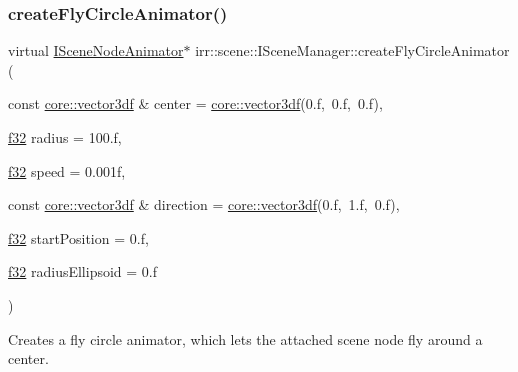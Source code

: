 \subsubsection{\texorpdfstring{create\+Fly\+Circle\+Animator()}{createFlyCircleAnimator()}}
{\footnotesize\ttfamily virtual \hyperlink{classirr_1_1scene_1_1ISceneNodeAnimator}{I\+Scene\+Node\+Animator}$\ast$ irr\+::scene\+::\+I\+Scene\+Manager\+::create\+Fly\+Circle\+Animator (\begin{DoxyParamCaption}\item[{const \hyperlink{namespaceirr_1_1core_a06f169d08b5c429f5575acb7edbad811}{core\+::vector3df} \&}]{center = {\ttfamily \hyperlink{namespaceirr_1_1core_a06f169d08b5c429f5575acb7edbad811}{core\+::vector3df}(0.f,~0.f,~0.f)},  }\item[{\hyperlink{namespaceirr_a0277be98d67dc26ff93b1a6a1d086b07}{f32}}]{radius = {\ttfamily 100.f},  }\item[{\hyperlink{namespaceirr_a0277be98d67dc26ff93b1a6a1d086b07}{f32}}]{speed = {\ttfamily 0.001f},  }\item[{const \hyperlink{namespaceirr_1_1core_a06f169d08b5c429f5575acb7edbad811}{core\+::vector3df} \&}]{direction = {\ttfamily \hyperlink{namespaceirr_1_1core_a06f169d08b5c429f5575acb7edbad811}{core\+::vector3df}(0.f,~1.f,~0.f)},  }\item[{\hyperlink{namespaceirr_a0277be98d67dc26ff93b1a6a1d086b07}{f32}}]{start\+Position = {\ttfamily 0.f},  }\item[{\hyperlink{namespaceirr_a0277be98d67dc26ff93b1a6a1d086b07}{f32}}]{radius\+Ellipsoid = {\ttfamily 0.f} }\end{DoxyParamCaption})\hspace{0.3cm}{\ttfamily [pure virtual]}}



Creates a fly circle animator, which lets the attached scene node fly around a center. 


